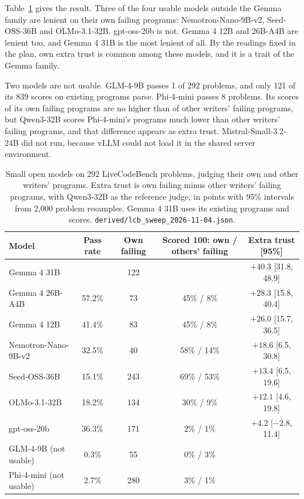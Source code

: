 \documentclass[10pt,letterpaper]{article}
\begin{document}
Table~\ref{tab:sweep} gives the result. Three of the four usable models outside the Gemma family are lenient on their
own failing programs: Nemotron-Nano-9B-v2, Seed-OSS-36B and OLMo-3.1-32B. gpt-oss-20b is not. Gemma 4 12B and 26B-A4B %
are lenient too, and Gemma 4 31B is the most lenient of all. By the readings fixed in the plan, own extra trust is
common among these models, and it is a trait of the Gemma family.

Two models are not usable. GLM-4-9B passes 1 of 292 problems, and only 121 of its 839 scores on existing programs
parse. Phi-4-mini passes 8 problems. Its scores of its own failing programs are no higher than of other writers'
failing programs, but Qwen3-32B scores Phi-4-mini's programs much lower than other writers' failing programs, and
that difference appears as extra trust. Mistral-Small-3.2-24B did not run, because vLLM could not load it in the shared
server environment.

\begin{table}[H]
\centering
\small
\caption{Small open models on 292 LiveCodeBench problems, judging their own and other writers' programs. Extra trust is
own failing minus other writers' failing programs, with Qwen3-32B as the reference judge, in points with 95\%
intervals from 2,000 problem resamples. Gemma 4 31B uses its existing programs and scores.
\texttt{derived/lcb\_sweep\_2026-11-04.json}.}
\label{tab:sweep}
\setlength{\tabcolsep}{4pt}
\begin{tabular}{@{}lcccc@{}}
\toprule
Model & Pass rate & Own failing & Scored 100: own / others' failing & Extra trust [95\%] \\
\midrule
Gemma 4 31B & & 122 & & $+40.3$ [31.8, 48.9] \\
Gemma 4 26B-A4B & 57.2\% & 73 & 45\% / 8\% & $+28.3$ [15.8, 40.4] \\
Gemma 4 12B & 41.4\% & 83 & 45\% / 8\% & $+26.0$ [15.7, 36.5] \\
Nemotron-Nano-9B-v2 & 32.5\% & 40 & 58\% / 14\% & $+18.6$ [6.5, 30.8] \\
Seed-OSS-36B & 15.1\% & 243 & 69\% / 53\% & $+13.4$ [6.5, 19.6] \\
OLMo-3.1-32B & 18.2\% & 134 & 30\% / 9\% & $+12.1$ [4.6, 19.8] \\
gpt-oss-20b & 36.3\% & 171 & 2\% / 1\% & $+4.2$ [$-2.8$, 11.4] \\
\midrule
GLM-4-9B (not usable) & 0.3\% & 55 & 0\% / 3\% & \\
Phi-4-mini (not usable) & 2.7\% & 280 & 3\% / 1\% & \\
\bottomrule
\end{tabular}
\end{table}
\end{document}
